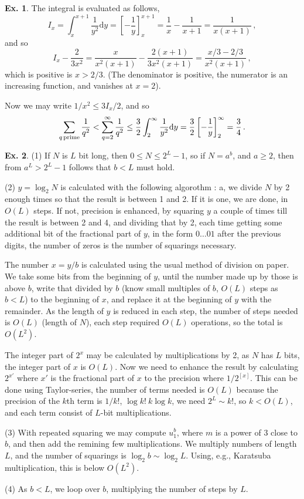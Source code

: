 \documentclass[a4paper,12pt]{article}
\def\d{\mathrm{d}}
\theoremstyle{definition}
\newtheorem{exercise}{Ex.}[section]
\begin{document}
\begin{exercise}
 The integral is evaluated as follows,
 \[
  I_x=\int_x^{x+1}\frac{1}{y^2}\d y = \left[ -\frac{1}{y}\right]_{x}^{x+1}=\frac{1}{x}-\frac{1}{x+1}=\frac{1}{x(x+1)}\,,
 \]
 and so
 \[
  I_x-\frac{2}{3x^2} = \frac{x}{x^2(x+1)} - \frac{2(x+1)}{3x^2(x+1)}=\frac{x/3-2/3}{x^2(x+1)}\,,
 \]
 which is positive is $x>2/3$. (The denominator is positive, the numerator is an increasing function, and vanishes at $x=2$).
 
 Now we may write $1/x^2 \le 3I_x/2$, and so
 \[
  \sum_{q\, \rm prime}\frac{1}{q^2} < \sum_{q=2}^\infty \frac{1}{q^2}\le \frac{3}{2}\int_{2}^\infty \frac{1}{y^2}\d y=\frac{3}{2}\left[-\frac{1}{y}\right]_{2}^\infty = \frac{3}{4}\,.
 \]
\end{exercise}

\begin{exercise}\label{ex:5.17}
 (1) If $N$ is $L$ bit long, then $0\le N \le 2^L-1$, so if $N=a^b$, and $a\ge 2$, then from $a^L > 2^L-1$ follows that $b<L$ must hold.
 
 (2) $y=\log_2 N$ is calculated with the following algorothm \cite{log2}: a, we divide $N$ by 2 enough times so that the result is between 1 and 2. If it is one, we are done, in 
 $O(L)$ steps. If not, precision is enhanced, by squaring $y$ a couple of times till the result is between 2 and 4, and dividing that by 2, each time getting some additional bit of the fractional part of $y$, in the form $0\dots01$ after the previous digits, the number of zeros is the number of squarings necessary.
 
 The number $x=y/b$ is calculated using the usual method of division on paper. We take some bits from the beginning of $y$, until the number made up by those is above $b$, write that divided by $b$ (know small multiples of $b$, $O(L)$ steps as $b<L$) to the beginning of $x$, and replace it at the beginning of $y$ with the remainder. As the length of $y$ is reduced in each step, the number of steps needed is $O(L)$ (length of $N$), each step required $O(L)$ operations, so the total is $O(L^2)$.
 
  The integer part of $2^x$ may be calculated by multiplications by 2, as $N$ has $L$ bits, the integer part of $x$ is $O(L)$. Now we need to enhance the result by calculating $2^{x'}$ where $x'$ is the fractional part of $x$ to the precision where $1/2^{[x]}$. This can be done using Taylor-series, the number of terms needed is $O(L)$ because the precision of the $k$th term is $1/k!{}$, $\log k!~k\log k$, we need $2^L \sim k!{}$, so $k < O(L)$, and each term consist of $L$-bit multiplications.
 
 (3) With repeated squaring we may compute $u_1^b$, where $m$ is a power of 3 close to $b$, and then add the remining few multiplications. We multiply numbers of length $L$, and the number of squarings is $\log_2 b\sim \log_2 L$. Using, e.g., Karatsuba multiplication, this is below $O(L^2)$.
 
 (4) As $b<L$, we loop over $b$, multiplying the number of steps by $L$.
\end{exercise}
\end{document}
